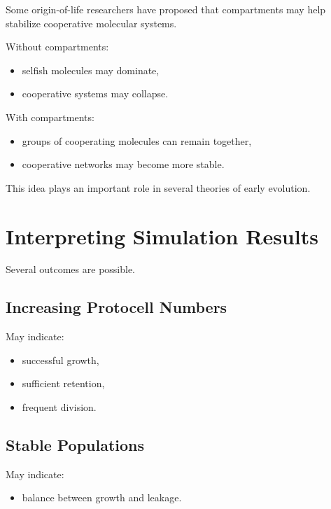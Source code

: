 \documentclass[
  oneside,
  openany]{book}
\providecommand{\tightlist}{%
  \setlength{\itemsep}{0pt}\setlength{\parskip}{0pt}}
\begin{document}
Some origin-of-life researchers have proposed that compartments may help stabilize cooperative molecular systems.

Without compartments:

\begin{itemize}
\tightlist
\item
  selfish molecules may dominate,
\item
  cooperative systems may collapse.
\end{itemize}

With compartments:

\begin{itemize}
\tightlist
\item
  groups of cooperating molecules can remain together,
\item
  cooperative networks may become more stable.
\end{itemize}

This idea plays an important role in several theories of early evolution.

\section{Interpreting Simulation Results}\label{interpreting-simulation-results-1}

Several outcomes are possible.

\subsection{Increasing Protocell Numbers}\label{increasing-protocell-numbers}

May indicate:

\begin{itemize}
\tightlist
\item
  successful growth,
\item
  sufficient retention,
\item
  frequent division.
\end{itemize}

\subsection{Stable Populations}\label{stable-populations}

May indicate:

\begin{itemize}
\tightlist
\item
  balance between growth and leakage.
\end{itemize}
\end{document}

